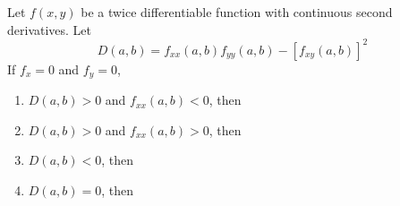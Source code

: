 \documentclass[12pt, a4paper]{article}
\begin{document}
\begin{thrm}
  Let \(f(x,y)\) be a twice differentiable function with continuous
  second derivatives. Let \[
    D(a,b) = f_{xx}(a,b)f_{yy}(a,b) - [f_{xy}(a,b)]^2
  \]
  If \(f_x = 0\) and \(f_y = 0\),
  \begin{enumerate}[label=(\alph*)]
  \item \(D(a,b) > 0\) and \(f_{xx}(a,b) < 0\), then
    \vspace{0.075in}
  \item \(D(a,b) > 0\) and \(f_{xx}(a,b) > 0\), then
    \vspace{0.075in}
  \item \(D(a,b) < 0\), then
    \vspace{0.075in}
  \item \(D(a,b) = 0\), then
  \end{enumerate}
\end{thrm}
\vspace{-0.5in}
\end{document}
